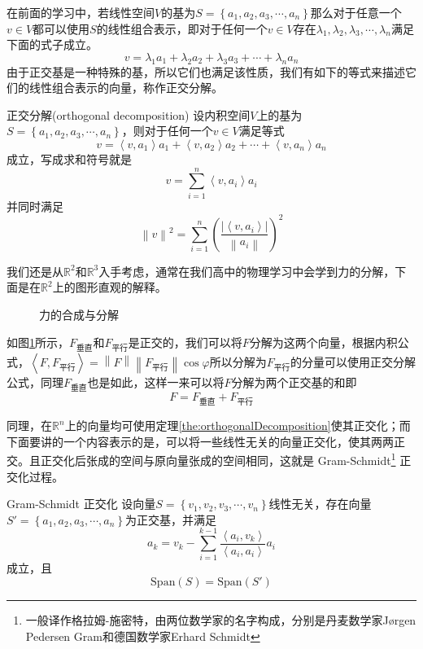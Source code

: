 在前面的学习中，若线性空间$V$的基为$S=\left\{ a_1,a_2,a_3,\cdots,a_n \right\}$那么对于任意一个$v\in V$都可以使用$S$的线性组合表示，即对于任何一个$v \in V$存在$\lambda_1,\lambda_2,\lambda_3,\cdots,\lambda_n$满足下面的式子成立。$$v=\lambda_1a_1+\lambda_2a_2+\lambda_3a_3+\cdots+\lambda_na_n$$由于正交基是一种特殊的基，所以它们也满足该性质，我们有如下的等式来描述它们的线性组合表示的向量，称作正交分解。

\begin{theorem}{正交分解(orthogonal decomposition)}
	\label{the:orthogonalDecomposition}
	设内积空间$V$上的基为$S=\left\{ a_1,a_2,a_3,\cdots,a_n \right\}$，则对于任何一个$v\in V$满足等式$$v=\left \langle v,a_1 \right \rangle a_1+\left \langle v,a_2 \right \rangle a_2+\cdots+\left \langle v,a_n \right \rangle a_n$$成立，写成求和符号就是$$v=\sum_{i=1}^{n} \left \langle v,a_i \right \rangle a_i$$并同时满足$$\left \| v \right \| ^2=\sum_{i=1}^{n}\left( \frac{\left | \left \langle v,a_i \right \rangle  \right |}{\left \| a_i \right \|} \right)^2$$
\end{theorem}

我们还是从$\mathbb{R}^2$和$\mathbb{R}^3$入手考虑，通常在我们高中的物理学习中会学到力的分解，下面是在$\mathbb{R}^2$上的图形直观的解释。

\begin{figure}[htbp]
	\centering
	
	\caption{力的合成与分解}
	\label{tikz:force}
\end{figure}

如图\ref{tikz:force}所示，$F_{\text{垂直}}$和$F_{\text{平行}}$是正交的，我们可以将$F$分解为这两个向量，根据内积公式，$\left \langle F,F_{\text{平行}} \right \rangle =\left \| F \right \| \left \| F_{\text{平行}} \right \|\cos \varphi $所以分解为$F_{\text{平行}}$的分量可以使用正交分解公式，同理$F_{\text{垂直}}$也是如此，这样一来可以将$F$分解为两个正交基的和即$$F=F_{\text{垂直}}+F_{\text{平行}}$$

同理，在$\mathbb{R}^n$上的向量均可使用定理\ref{the:orthogonalDecomposition}使其正交化；而下面要讲的一个内容表示的是，可以将一些线性无关的向量正交化，使其两两正交。且正交化后张成的空间与原向量张成的空间相同，这就是 Gram-Schmidt\footnote{一般译作格拉姆-施密特，由两位数学家的名字构成，分别是丹麦数学家Jørgen Pedersen Gram和德国数学家Erhard Schmidt} 正交化过程。

\begin{theorem}{Gram-Schmidt 正交化}
	设向量$S=\left\{ v_1,v_2,v_3,\cdots,v_n \right\}$线性无关，存在向量$S'=\left\{ a_1,a_2,a_3,\cdots,a_n \right\}$为正交基，并满足
	$$a_k=v_k-\sum_{i=1}^{k-1} \frac{\left \langle a_i,v_k \right \rangle }{\left \langle a_i,a_i \right \rangle }a_i $$
	成立，且$$\text{Span}(S)=\text{Span}(S')$$
\end{theorem}

